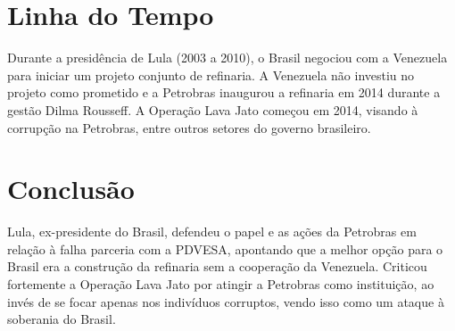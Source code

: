 \documentclass[
   article,       
   12pt,          
   oneside,       
   a4paper,       
   english,       
   brazil,        
   sumario=tradicional
   ]{abntex2}
\begin{document}
\section{Linha do Tempo}
Durante a presidência de Lula (2003 a 2010), o Brasil negociou com a Venezuela para iniciar um projeto conjunto de refinaria. A Venezuela não investiu no projeto como prometido e a Petrobras inaugurou a refinaria em 2014 durante a gestão Dilma Rousseff.
A Operação Lava Jato começou em 2014, visando à corrupção na Petrobras, entre outros setores do governo brasileiro.
\section{Conclusão}
Lula, ex-presidente do Brasil, defendeu o papel e as ações da Petrobras em relação à falha parceria com a PDVESA, apontando que a melhor opção para o Brasil era a construção da refinaria sem a cooperação da Venezuela. Criticou fortemente a Operação Lava Jato por atingir a Petrobras como instituição, ao invés de se focar apenas nos indivíduos corruptos, vendo isso como um ataque à soberania do Brasil.

\postextual

\end{document}
